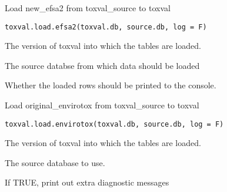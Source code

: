 \documentclass[letterpaper]{book}
\begin{document}
%
\begin{Description}\relax
Load new\_efsa2 from toxval\_source to toxval
\end{Description}
%
\begin{Usage}
\begin{verbatim}
toxval.load.efsa2(toxval.db, source.db, log = F)
\end{verbatim}
\end{Usage}
%
\begin{Arguments}
\begin{ldescription}
\item[\code{toxval.db}] The version of toxval into which the tables are loaded.

\item[\code{source.db}] The source databse from which data should be loaded

\item[\code{verbose}] Whether the loaded rows should be printed to the console.
\end{ldescription}
\end{Arguments}
%
\begin{Description}\relax
Load original\_envirotox from toxval\_source to toxval
\end{Description}
%
\begin{Usage}
\begin{verbatim}
toxval.load.envirotox(toxval.db, source.db, log = F)
\end{verbatim}
\end{Usage}
%
\begin{Arguments}
\begin{ldescription}
\item[\code{toxval.db}] The version of toxval into which the tables are loaded.

\item[\code{source.db}] The source database to use.

\item[\code{verbose}] If TRUE, print out extra diagnostic messages
\end{ldescription}
\end{Arguments}
\end{document}
